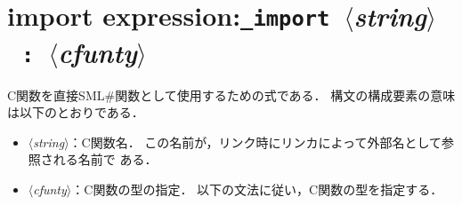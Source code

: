 \documentclass{jbook}
\newcommand{\txt}[2]{#2}
\newcommand{\smlsharp}{SML\#}
\newcommand{\nonterm}[1]{\mbox{$\langle$}{\it #1}\mbox{$\rangle$}}
\newcommand{\term}[1]{\mbox{{\tt #1}}}
\begin{document}
\section{\txt{インポート式}{import expression}:\term{\_import}\ \nonterm{string}\ \term{:}\ \nonterm{cfunty}}

\ifjp%
	C関数を直接\smlsharp{}関数として使用するための式である．
	構文の構成要素の意味は以下のとおりである．
\begin{itemize}
\item \nonterm{string}：C関数名．
	この名前が，リンク時にリンカによって外部名として参照される名前で
ある．
\item \nonterm{cfunty}：C関数の型の指定．
	以下の文法に従い，C関数の型を指定する．
\end{itemize}	
\end{document}
